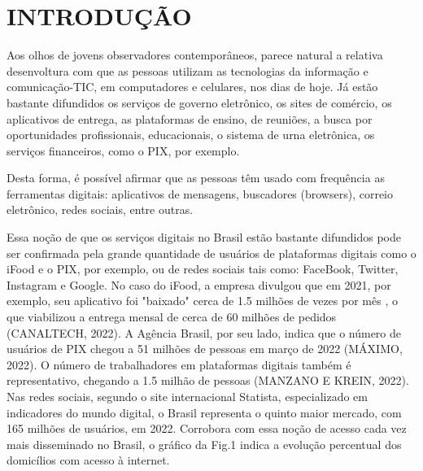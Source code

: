 
\incluirsumario%


\textual%


\chapter[INTRODUÇÃO]{INTRODUÇÃO}\label{INTRODUÇÃO}
Aos olhos de jovens observadores contemporâneos, parece natural a relativa desenvoltura com que as pessoas utilizam as tecnologias da informação e comunicação-TIC, em computadores e celulares, nos dias de hoje. Já estão bastante difundidos os serviços de governo eletrônico, os sites de comércio, os aplicativos de entrega, as plataformas de ensino, de reuniões, a busca por oportunidades profissionais, educacionais, o sistema de urna eletrônica, os serviços financeiros, como o PIX, por exemplo.

Desta forma, é possível afirmar que as pessoas têm usado com frequência  as ferramentas digitais: aplicativos de mensagens, buscadores (browsers), correio eletrônico, redes sociais, entre outras.

Essa noção de que os serviços digitais no Brasil estão bastante difundidos pode ser confirmada pela grande quantidade de usuários de plataformas digitais como o iFood e o PIX, por exemplo, ou de redes sociais tais como: FaceBook, Twitter, Instagram e Google. No caso do iFood, a empresa divulgou que em 2021, por exemplo, seu aplicativo foi "baixado" cerca de 1.5 milhões de vezes por mês , o que viabilizou a entrega mensal de cerca de 60 milhões de pedidos  (CANALTECH, 2022). A Agência Brasil, por seu lado, indica que o número de usuários de PIX chegou a 51 milhões de pessoas em março de 2022 (MÁXIMO, 2022). O número de trabalhadores em plataformas digitais também é representativo, chegando a 1.5 milhão de pessoas  (MANZANO E KREIN, 2022). Nas redes sociais, segundo o site internacional Statista, especializado em indicadores do mundo digital, o Brasil representa o quinto maior mercado, com 165 milhões de usuários, em 2022. Corrobora com essa noção de acesso cada vez mais disseminado no Brasil, o gráfico da Fig.1 indica a evolução percentual dos domicílios com acesso à internet.



